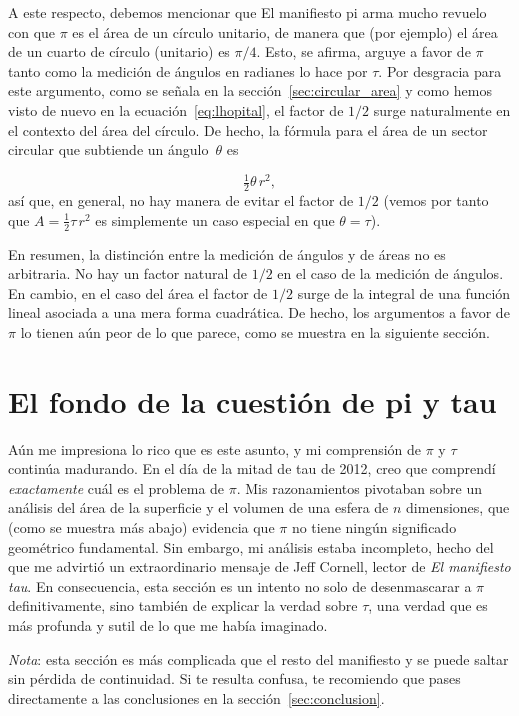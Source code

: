 A este respecto, debemos mencionar que El manifiesto pi arma mucho revuelo con que $\pi$ es el área de un círculo unitario, de manera que (por ejemplo) el área de un cuarto de círculo (unitario) es $\pi/4$. Esto, se afirma, arguye a favor de $\pi$ tanto como la medición de ángulos en radianes lo hace por $\tau$. Por desgracia para este argumento, como se señala en la sección~\ref{sec:circular_area} y como hemos visto de nuevo en la ecuación~\eqref{eq:lhopital}, el factor de $1/2$ surge naturalmente en el contexto del área del círculo. De hecho, la fórmula para el área de un sector circular que subtiende un ángulo~$\theta$ es

\[
\tfrac{1}{2}\theta\, r^2,
\]
así que, en general, no hay manera de evitar el factor de $1/2$ (vemos por tanto que $A = \frac{1}{2} \tau\, r^2$ es simplemente un caso especial en que  $\theta = \tau$).

En resumen, la distinción entre la medición de ángulos y de áreas no es arbitraria. No hay un factor natural de $1/2$ en el caso de la medición de ángulos. En cambio, en el caso del área el factor de $1/2$ surge de la integral de una función lineal asociada a una mera forma cuadrática. De hecho, los argumentos a favor de $\pi$ lo tienen aún peor de lo que parece, como se muestra en la siguiente sección.


\section{El fondo de la cuestión de pi y tau} %
\label{sec:getting_to_the_bottom_of_pi}

Aún me impresiona lo rico que es este asunto, y mi comprensión de $\pi$ y $\tau$ continúa madurando. En el día de la mitad de tau de 2012, creo que comprendí \emph{exactamente} cuál es el problema de $\pi$. Mis razonamientos pivotaban sobre un análisis del área de la superficie y el volumen de una esfera de $n$ dimensiones, que (como se muestra más abajo) evidencia que $\pi$ no tiene ningún significado geométrico fundamental. Sin embargo, mi análisis estaba incompleto, hecho del que me advirtió un extraordinario mensaje de Jeff Cornell, lector de \emph{El manifiesto tau}. En consecuencia, esta sección es un intento no solo de desenmascarar a $\pi$ definitivamente, sino también de explicar la verdad sobre $\tau$, una verdad que es más profunda y sutil de lo que me había imaginado.

\emph{Nota}: esta sección es más complicada que el resto del manifiesto y se puede saltar sin pérdida de continuidad. Si te resulta confusa, te recomiendo que pases directamente a las conclusiones en la sección~\ref{sec:conclusion}.

